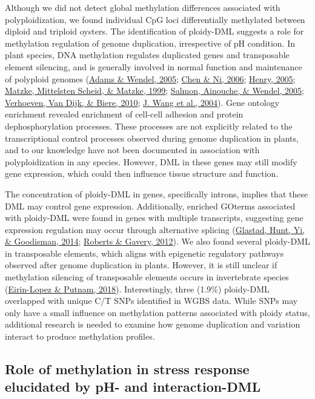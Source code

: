 \documentclass [11pt, proquest] {uwthesis}[2015/03/03]
\begin{document}
Although we did not detect global methylation differences associated with polyploidization, we found individual CpG loci differentially methylated between diploid and triploid oysters. The identification of ploidy-DML suggests a role for methylation regulation of genome duplication, irrespective of pH condition. In plant species, DNA methylation regulates duplicated genes and transposable element silencing, and is generally involved in normal function and maintenance of polyploid genomes (\protect\hyperlink{ref-Adams2005}{Adams \& Wendel, 2005}; \protect\hyperlink{ref-Chen2006}{Chen \& Ni, 2006}; \protect\hyperlink{ref-Henry2005}{Henry, 2005}; \protect\hyperlink{ref-Matzke1999}{Matzke, Mittelsten Scheid, \& Matzke, 1999}; \protect\hyperlink{ref-Salmon2005}{Salmon, Ainouche, \& Wendel, 2005}; \protect\hyperlink{ref-Verhoeven2010}{Verhoeven, Van Dijk, \& Biere, 2010}; \protect\hyperlink{ref-Wang2004}{J. Wang et al., 2004}). Gene ontology enrichment revealed enrichment of cell-cell adhesion and protein dephosphorylation processes. These processes are not explicitly related to the transcriptional control processes observed during genome duplication in plants, and to our knowledge have not been documented in association with polyploidization in any species. However, DML in these genes may still modify gene expression, which could then influence tissue structure and function.

The concentration of ploidy-DML in genes, specifically introns, implies that these DML may control gene expression. Additionally, enriched GOterms associated with ploidy-DML were found in genes with multiple transcripts, suggesting gene expression regulation may occur through alternative splicing (\protect\hyperlink{ref-Glastad2014}{Glastad, Hunt, Yi, \& Goodisman, 2014}; \protect\hyperlink{ref-Roberts2012}{Roberts \& Gavery, 2012}). We also found several ploidy-DML in transposable elements, which aligns with epigenetic regulatory pathways observed after genome duplication in plants. However, it is still unclear if methylation silencing of transposable elements occurs in invertebrate species (\protect\hyperlink{ref-Eirin-Lopez2018}{Eirin-Lopez \& Putnam, 2018}). Interestingly, three (1.9\%) ploidy-DML overlapped with unique C/T SNPs identified in WGBS data. While SNPs may only have a small influence on methylation patterns associated with ploidy status, additional research is needed to examine how genome duplication and variation interact to produce methylation profiles.

\hypertarget{role-of-methylation-in-stress-response-elucidated-by-ph--and-interaction-dml}{%
\subsection{Role of methylation in stress response elucidated by pH- and interaction-DML}\label{role-of-methylation-in-stress-response-elucidated-by-ph--and-interaction-dml}}
\end{document}
